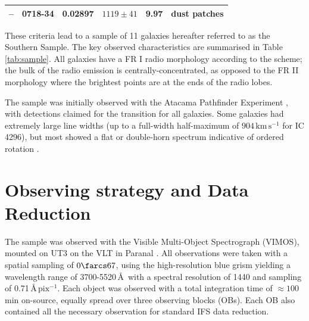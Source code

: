 \documentclass[a4paper,fleqn,usenatbib]{mnras}
\begin{document}
\begin{table}
\begin{tabular}{l c c c c l}
			--			& 0718-\leavevmode\phantom{0}34 		& 0.02897 	& $1119 \pm 41$		& 9.97 & dust patches\tnote{e} \\
			\hline
			\hline
		\end{tabular}
	\end{table}

	These criteria lead to a sample of 11 galaxies hereafter referred to as the Southern Sample. The key observed characteristics are summarised in Table \ref{tab:sample}.
	All galaxies have a FR I radio morphology according to the \citet{Fanaroff1974} scheme; the bulk of the radio emission is centrally-concentrated, as opposed to the FR II morphology where the brightest points are at the ends of the radio lobes. 
	
	The sample was initially observed with the Atacama Pathfinder Experiment \citep[APEX; ][]{Gusten2006}, with detections claimed for the  transition for all galaxies. Some galaxies had extremely large line widths (up to a full-width half-maximum of $904 \, \mathrm{km \, s^{-1}}$ for IC 4296), but most showed a flat or double-horn spectrum indicative of ordered rotation \citep{Prandoni2012}.


\section{Observing strategy and Data Reduction}
	\label{sec:obs}
	The sample was observed with the Visible Multi-Object Spectrograph (VIMOS), mounted on UT3 on the VLT in Paranal \citep{LeFevre2003}. All observations were taken with a spatial sampling of $0\farcs67$, using the high-resolution blue grism yielding a wavelength range of 3700-5520\,\AA\ with a spectral resolution of 1440 and sampling of 0.71\,\AA\,$\mathrm{pix^{-1}}$. Each object was observed with a total integration time of $\approx 100$\,min on-source, equally spread over three observing blocks (OBs). Each OB also contained all the necessary observation for standard IFS data reduction. 
\end{document}

